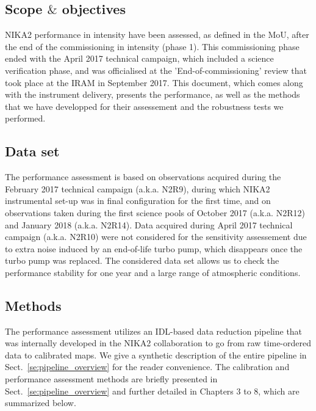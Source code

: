 
\subsection*{Scope $\&$ objectives}
NIKA2 performance in intensity have been assessed, as defined in the
MoU, after the end of the commissioning in intensity (phase 1). This
commissioning phase ended with the April 2017 technical campaign,
which included a science verification phase, and was officialised at
the 'End-of-commissioning' review that took place at the IRAM in September
2017. This document, which comes along with the instrument delivery,
presents the performance, as well as the methods that we have developped
for their assessement and the robustness tests we performed.

\subsection*{Data set}
The performance assessment is based on observations acquired during
the February 2017 technical campaign (a.k.a. N2R9), during which NIKA2
instrumental set-up was in final configuration for the first time, and
on observations taken during the first science pools of October 2017
(a.k.a. N2R12) and January 2018 (a.k.a. N2R14). Data acquired during
April 2017 technical campaign (a.k.a. N2R10) were not considered for
the sensitivity assessement due to extra noise induced by an
end-of-life turbo pump, which disappears once the turbo pump was
replaced. The considered data set allows us to check the performance
stability for one year and a large range of atmospheric conditions. 

\subsection*{Methods}

The performance assessment utilizes an IDL-based data reduction
pipeline that was internally developed in the NIKA2 collaboration
to go from raw time-ordered data to calibrated maps. We give a
synthetic description of the entire pipeline in
Sect.~\ref{se:pipeline_overview} for the reader convenience. The
calibration and performance assessment methods are briefly presented
in Sect.~\ref{se:pipeline_overview} and further detailed in Chapters 3
to 8, which are summarized below.

